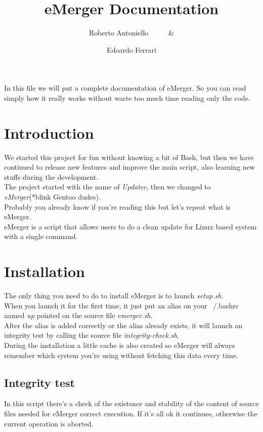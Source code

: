 \documentclass{article}
\author{
  Roberto Antoniello \ \ \ \ \ \&
  \and
  Edoardo Ferrari} %
\title{eMerger Documentation} %
\begin{document}
\maketitle %

\begin{center}In this file we will put a complete documentation of eMerger. So you can read simply how it really works without waste too much time reading only the code.
\end{center}

\section{Introduction}
We started this project for fun without knowing a bit of Bash, but then we have continued to release new features and improve the main script, also learning new stuffs during the development.\\
The project started with the name of \textit{Updater}, then we changed to \textit{eMerger}(*blink Gentoo dudes).\\
Probably you already know if you're reading this but let's repeat what is eMerger.\\
eMerger is a script that allows users to do a clean update for Linux based system with a single command. 

\section{Installation}
The only thing you need to do to install eMerger is to launch \textit{setup.sh}.\\
When you launch it for the first time, it just put an alias on your ~/.bashrc named \textit{up} pointed on the source file \textit{emerger.sh}. \\
After the alias is added correctly  or the alias already exists, it will launch an integrity test by calling the source file \textit{integrity-check.sh}.\\
During the installation a little cache is also created so eMerger will always remember which system you're using without fetching this data every time.

\subsection{Integrity test}
In this script there's a check of the existence and stability of the content of source files needed for eMerger correct execution. If it's all ok it continues, otherwise the current operation is aborted.
\end{document}
